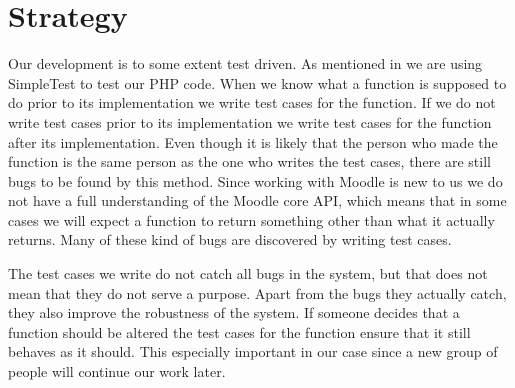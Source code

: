 \section{Strategy}
\label{sec:strategy}
Our development is to some extent test driven.
As mentioned in  we are using SimpleTest to test our PHP code.
When we know what a function is supposed to do prior to its implementation we write test cases for the function.
If we do not write test cases prior to its implementation we write test cases for the function after its implementation.
Even though it is likely that the person who made the function is the same person as the one who writes the test cases, there are still bugs to be found by this method.
Since working with Moodle is new to us we do not have a full understanding of the Moodle core API, which means that in some cases we will expect a function to return something other than what it actually returns.
Many of these kind of bugs are discovered by writing test cases.

The test cases we write do not catch all bugs in the system, but that does not mean that they do not serve a purpose.
Apart from the bugs they actually catch, they also improve the robustness of the system.
If someone decides that a function should be altered the test cases for the function ensure that it still behaves as it should.
This especially important in our case since a new group of people will continue our work later.
